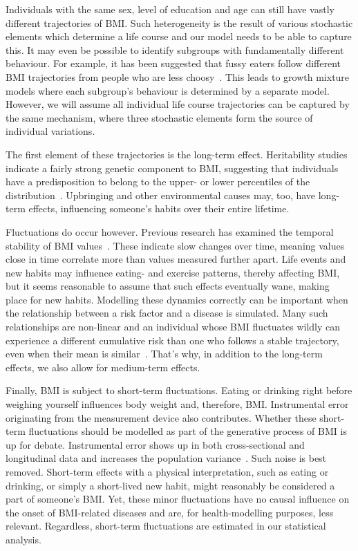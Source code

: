 \documentclass{imammb}
\numberwithin{equation}{section}
\begin{document}
Individuals with the same sex, level of education and age can still have vastly different trajectories of BMI. Such heterogeneity is the result of various stochastic elements which determine a life course and our model needs to be able to capture this. It may even be possible to identify subgroups with fundamentally different behaviour. For example, it has been suggested that fussy eaters follow different BMI trajectories from people who are less choosy~\citep{Herle2020}. This leads to growth mixture models where each subgroup's behaviour is determined by a separate model. However, we will assume all individual life course trajectories can be captured by the same mechanism, where three stochastic elements form the source of individual variations.

The first element of these trajectories is the long-term effect. Heritability studies indicate a fairly strong genetic component to BMI, suggesting that individuals have a predisposition to belong to the upper- or lower percentiles of the distribution~\citep{Mathias2003, Goode2007, Ordonana2007}. Upbringing and other environmental causes may, too, have long-term effects, influencing someone's habits over their entire lifetime.

Fluctuations do occur however. Previous research has examined the temporal stability of BMI values~\citep{Wilsgaard2001, Ulmer2003, Juhola2011, Bayer2011}. These indicate slow changes over time, meaning values close in time correlate more than values measured further apart. Life events and new habits may influence eating- and exercise patterns, thereby affecting BMI, but it seems reasonable to assume that such effects eventually wane, making place for new habits. Modelling these dynamics correctly can be important when the relationship between a risk factor and a disease is simulated. Many such relationships are non-linear and an individual whose BMI fluctuates wildly can experience a different cumulative risk than one who follows a stable trajectory, even when their mean is similar~\citep{Murray2020}. That's why, in addition to the long-term effects, we also allow for medium-term effects.

Finally, BMI is subject to short-term fluctuations. Eating or drinking right before weighing yourself influences body weight and, therefore, BMI. Instrumental error originating from the measurement device also contributes. Whether these short-term fluctuations should be modelled as part of the generative process of BMI is up for debate. Instrumental error shows up in both cross-sectional and longitudinal data and increases the population variance~\citep{Biehl2013}. Such noise is best removed. Short-term effects with a physical interpretation, such as eating or drinking, or simply a short-lived new habit, might reasonably be considered a part of someone's BMI. Yet, these minor fluctuations have no causal influence on the onset of BMI-related diseases and are, for health-modelling purposes, less relevant. Regardless, short-term fluctuations are estimated in our statistical analysis.
\end{document}
